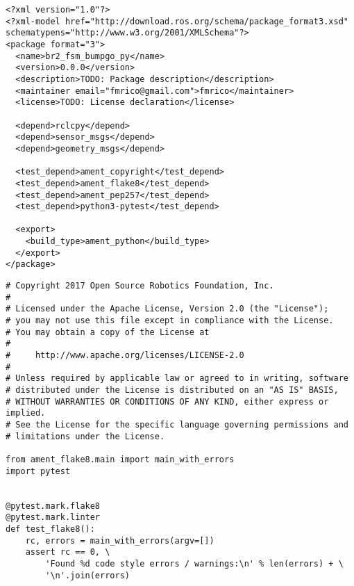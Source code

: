  \footnotesize
\begin{tcolorbox}[sharp corners, colframe=gray!80, colback=LightGray, left=0pt, top=0pt, bottom=0pt, title=\texttt{br2\_fsm\_bumpgo\_py/package.xml}]
  \begin{verbatim}
<?xml version="1.0"?>
<?xml-model href="http://download.ros.org/schema/package_format3.xsd" schematypens="http://www.w3.org/2001/XMLSchema"?>
<package format="3">
  <name>br2_fsm_bumpgo_py</name>
  <version>0.0.0</version>
  <description>TODO: Package description</description>
  <maintainer email="fmrico@gmail.com">fmrico</maintainer>
  <license>TODO: License declaration</license>

  <depend>rclcpy</depend>
  <depend>sensor_msgs</depend>
  <depend>geometry_msgs</depend>

  <test_depend>ament_copyright</test_depend>
  <test_depend>ament_flake8</test_depend>
  <test_depend>ament_pep257</test_depend>
  <test_depend>python3-pytest</test_depend>

  <export>
    <build_type>ament_python</build_type>
  </export>
</package>
    \end{verbatim}
    \end{tcolorbox}
  \normalsize

 \footnotesize
\begin{tcolorbox}[sharp corners, colframe=gray!80, colback=LightGray, left=0pt, top=0pt, bottom=0pt, title=\texttt{br2\_fsm\_bumpgo\_py/test/test\_flake8.py}]
  \begin{verbatim}
# Copyright 2017 Open Source Robotics Foundation, Inc.
#
# Licensed under the Apache License, Version 2.0 (the "License");
# you may not use this file except in compliance with the License.
# You may obtain a copy of the License at
#
#     http://www.apache.org/licenses/LICENSE-2.0
#
# Unless required by applicable law or agreed to in writing, software
# distributed under the License is distributed on an "AS IS" BASIS,
# WITHOUT WARRANTIES OR CONDITIONS OF ANY KIND, either express or implied.
# See the License for the specific language governing permissions and
# limitations under the License.

from ament_flake8.main import main_with_errors
import pytest


@pytest.mark.flake8
@pytest.mark.linter
def test_flake8():
    rc, errors = main_with_errors(argv=[])
    assert rc == 0, \
        'Found %d code style errors / warnings:\n' % len(errors) + \
        '\n'.join(errors)
    \end{verbatim}
    \end{tcolorbox}
  \normalsize

